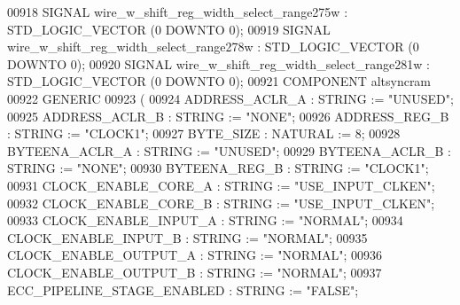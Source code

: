 \begin{DoxyCode}
{00918      \textcolor{keywordflow}{SIGNAL}  \textcolor{vhdlchar}{wire_w_shift_reg_width_select_range275w}    \textcolor{vhdlchar}{:}   \textcolor{comment}{STD\_LOGIC\_VECTOR} \textcolor{vhdlchar}{(}\textcolor{vhdllogic}{}\textcolor{vhdllogic}{0} \textcolor{keywordflow}{DOWNTO} \textcolor{vhdllogic}{}\textcolor{vhdllogic}{0}\textcolor{vhdlchar}{)};
00919      \textcolor{keywordflow}{SIGNAL}  \textcolor{vhdlchar}{wire_w_shift_reg_width_select_range278w}    \textcolor{vhdlchar}{:}   \textcolor{comment}{STD\_LOGIC\_VECTOR} \textcolor{vhdlchar}{(}\textcolor{vhdllogic}{}\textcolor{vhdllogic}{0} \textcolor{keywordflow}{DOWNTO} \textcolor{vhdllogic}{}\textcolor{vhdllogic}{0}\textcolor{vhdlchar}{)};
00920      \textcolor{keywordflow}{SIGNAL}  \textcolor{vhdlchar}{wire_w_shift_reg_width_select_range281w}    \textcolor{vhdlchar}{:}   \textcolor{comment}{STD\_LOGIC\_VECTOR} \textcolor{vhdlchar}{(}\textcolor{vhdllogic}{}\textcolor{vhdllogic}{0} \textcolor{keywordflow}{DOWNTO} \textcolor{vhdllogic}{}\textcolor{vhdllogic}{0}\textcolor{vhdlchar}{)};
00921      \textcolor{keywordflow}{COMPONENT}  altsyncram
00922      \textcolor{keywordflow}{GENERIC} 
00923      (
00924         ADDRESS\_ACLR\_A  :   \textcolor{comment}{STRING} := \textcolor{keyword}{"UNUSED"};
00925         ADDRESS\_ACLR\_B  :   \textcolor{comment}{STRING} := \textcolor{keyword}{"NONE"};
00926         ADDRESS\_REG\_B   :   \textcolor{comment}{STRING} := \textcolor{keyword}{"CLOCK1"};
00927         BYTE\_SIZE   :   \textcolor{comment}{NATURAL} := \textcolor{vhdllogic}{}\textcolor{vhdllogic}{8};
00928         BYTEENA\_ACLR\_A  :   \textcolor{comment}{STRING} := \textcolor{keyword}{"UNUSED"};
00929         BYTEENA\_ACLR\_B  :   \textcolor{comment}{STRING} := \textcolor{keyword}{"NONE"};
00930         BYTEENA\_REG\_B   :   \textcolor{comment}{STRING} := \textcolor{keyword}{"CLOCK1"};
00931         CLOCK\_ENABLE\_CORE\_A :   \textcolor{comment}{STRING} := \textcolor{keyword}{"USE\_INPUT\_CLKEN"};
00932         CLOCK\_ENABLE\_CORE\_B :   \textcolor{comment}{STRING} := \textcolor{keyword}{"USE\_INPUT\_CLKEN"};
00933         CLOCK\_ENABLE\_INPUT\_A    :   \textcolor{comment}{STRING} := \textcolor{keyword}{"NORMAL"};
00934         CLOCK\_ENABLE\_INPUT\_B    :   \textcolor{comment}{STRING} := \textcolor{keyword}{"NORMAL"};
00935         CLOCK\_ENABLE\_OUTPUT\_A   :   \textcolor{comment}{STRING} := \textcolor{keyword}{"NORMAL"};
00936         CLOCK\_ENABLE\_OUTPUT\_B   :   \textcolor{comment}{STRING} := \textcolor{keyword}{"NORMAL"};
00937         ECC\_PIPELINE\_STAGE\_ENABLED  :   \textcolor{comment}{STRING} := \textcolor{keyword}{"FALSE"};
}
\end{DoxyCode}
